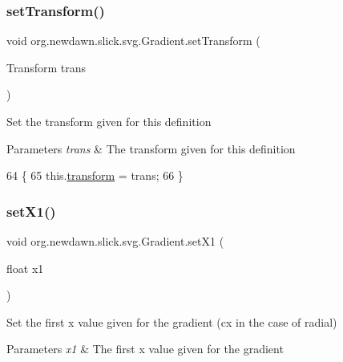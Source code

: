 \subsubsection{\texorpdfstring{set\+Transform()}{setTransform()}}
{\footnotesize\ttfamily void org.\+newdawn.\+slick.\+svg.\+Gradient.\+set\+Transform (\begin{DoxyParamCaption}\item[{Transform}]{trans }\end{DoxyParamCaption})\hspace{0.3cm}{\ttfamily [inline]}}

Set the transform given for this definition


\begin{DoxyParams}{Parameters}
{\em trans} & The transform given for this definition \\
\hline
\end{DoxyParams}

\begin{DoxyCode}
64                                               \{
65         this.\mbox{\hyperlink{classorg_1_1newdawn_1_1slick_1_1svg_1_1_gradient_a2ea5e518ebb63dd89e1613c7dcd40076}{transform}} = trans;
66     \}
\end{DoxyCode}
\mbox{\label{classorg_1_1newdawn_1_1slick_1_1svg_1_1_gradient_a8742f8072cf0c34b9b33b5d3a069cf6d}} 
\subsubsection{\texorpdfstring{set\+X1()}{setX1()}}
{\footnotesize\ttfamily void org.\+newdawn.\+slick.\+svg.\+Gradient.\+set\+X1 (\begin{DoxyParamCaption}\item[{float}]{x1 }\end{DoxyParamCaption})\hspace{0.3cm}{\ttfamily [inline]}}

Set the first x value given for the gradient (cx in the case of radial)


\begin{DoxyParams}{Parameters}
{\em x1} & The first x value given for the gradient \\
\hline
\end{DoxyParams}

